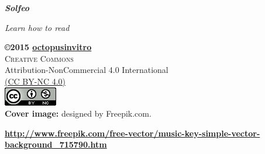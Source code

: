 	\AddToShipoutPicture*{\BackgroundPic}


	\hspace*{-3cm}  {\fontsize{50pt}{50pt}\selectfont\AlegreyaBlack\bfseries\itshape\color{blue}Solfeo}\par\vspace*{\baselineskip}
	\hspace*{-3cm}  {\LARGE\itshape\color{gray} Learn how to read\\}






	\newpage
	\thispagestyle{empty}
	\phantom{hola!}

		
	\null
	\vfill
	\bc
		\begin{minipage}{0.65\textwidth}
			{\sffamily
				\bc
					\textbf{\copyright 2015 \href{https://github.com/octopusinvitro}{\textbf{octopusinvitro}}}\\
					\textsc{Creative Commons}\\
					Attribution-NonCommercial 4.0 International\\
					\href{http://creativecommons.org/licenses/by-nc/4.0/legalcode}{(CC BY-NC 4.0)}\\[12pt]
					\includegraphics{license.png}\\[12pt]

					\small\textbf{Cover image:} designed by Freepik.com.
				\ec
			}%
		\end{minipage}\vspace*{1ex}
		\small\href{http://www.freepik.com/free-vector/music-key-simple-vector-background_715790.htm}{\textbf{\url{http://www.freepik.com/free-vector/music-key-simple-vector-background_715790.htm}}}
	\ec 


